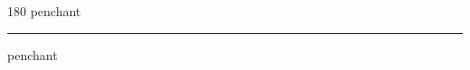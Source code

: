 
\begin{frame}
\begin{center}
\begin{turn}{180}
{\fontsize{2.5cm}{1em}\selectfont penchant}
\end{turn}
\vspace{1em}\par  
\hrule
\vspace{1em}\par  
{\fontsize{2.5cm}{1em}\selectfont penchant}
\end{center}
\end{frame}
